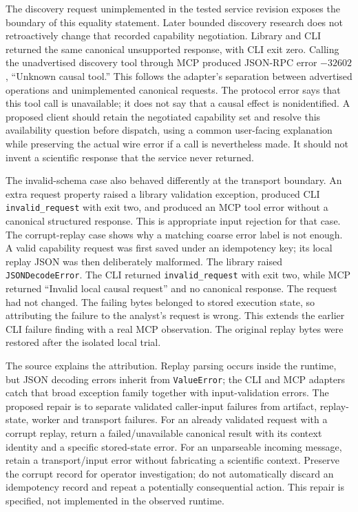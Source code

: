 The discovery request unimplemented in the tested service revision exposes the boundary of this equality statement. Later bounded discovery research does not retroactively change that recorded capability negotiation. Library and CLI returned the same canonical unsupported response,
with CLI exit zero. Calling the unadvertised discovery tool through MCP
produced JSON-RPC error $-32602$, ``Unknown causal tool.'' This follows the
adapter's separation between advertised operations and unimplemented canonical
requests. The protocol error says that this tool call is unavailable; it does
not say that a causal effect is nonidentified. A proposed client should retain
the negotiated capability set and resolve this availability question before
dispatch, using a common user-facing explanation while preserving the actual
wire error if a call is nevertheless made. It should not invent a scientific
response that the service never returned.
\citep{exec16_parity_observed,v12_mcp_legacy_tools,exec16_parity_design}

The invalid-schema case also behaved differently at the transport boundary.
An extra request property raised a library validation exception, produced
CLI \texttt{invalid\_request} with exit two, and produced an MCP tool error
without a canonical structured response. This is appropriate input rejection
for that case. The corrupt-replay case shows why a matching coarse error label
is not enough. A valid capability request was first saved under an idempotency
key; its local replay JSON was then deliberately malformed. The library raised
\texttt{JSONDecodeError}. The CLI returned \texttt{invalid\_request} with
exit two, while MCP returned ``Invalid local causal request'' and no canonical
response. The request had not changed. The failing bytes belonged to stored
execution state, so attributing the failure to the analyst's request is wrong.
This extends the earlier CLI failure finding with a real MCP observation.
The original replay bytes were restored after the isolated local trial.
\citep{exec16_parity_observed}

The source explains the attribution. Replay parsing occurs inside the runtime,
but JSON decoding errors inherit from \texttt{ValueError}; the CLI and MCP
adapters catch that broad exception family together with input-validation
errors. The proposed repair is to separate validated caller-input failures
from artifact, replay-state, worker and transport failures. For an already
validated request with a corrupt replay, return a failed/unavailable canonical
result with its context identity and a specific stored-state error. For an
unparseable incoming message, retain a transport/input error without fabricating
a scientific context. Preserve the corrupt record for operator investigation;
do not automatically discard an idempotency record and repeat a potentially
consequential action. This repair is specified, not implemented in the observed
runtime. \citep{exec16_parity_observed,exec16_parity_design}

